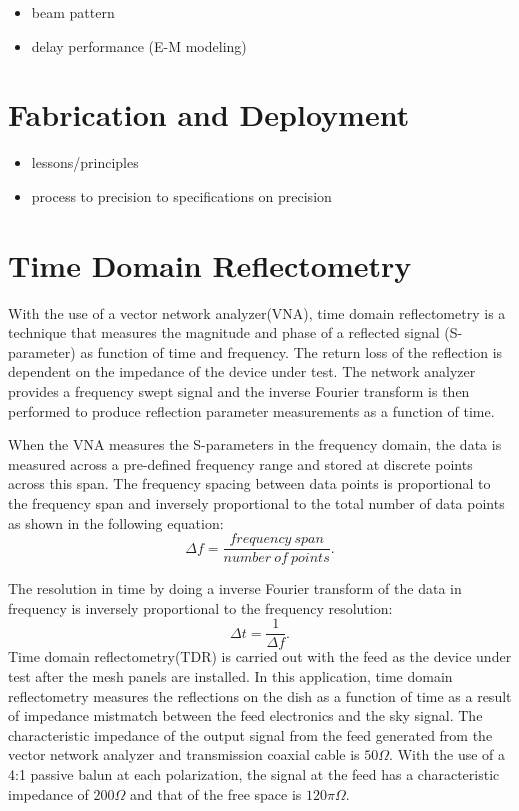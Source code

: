 \documentclass[preprint]{aastex}  %
\begin{document}
\begin{itemize}
\item beam pattern
\item delay performance (E-M modeling)
\end{itemize}

\section{Fabrication and Deployment}
\label{sec:deploy}

\begin{itemize}
\item lessons/principles
\item process to precision to specifications on precision
\end{itemize}
\clearpage

\section{Time Domain Reflectometry}
\label{sec:reflect}
With the use of a vector network analyzer(VNA), time domain reflectometry is a technique that measures the magnitude and phase of a reflected signal (S-parameter) as function of time and frequency. The return loss of the reflection is dependent on the impedance of the device under test. The network analyzer provides
 a frequency swept signal and the inverse Fourier transform is then performed to produce reflection parameter measurements as a function of time.

When the VNA measures the S-parameters in the frequency domain, the data is measured across a pre-defined frequency range and stored at discrete points across this span. The frequency spacing between data points is proportional to the frequency span and inversely proportional to the total number of data points as shown in the following equation:
\begin{equation}
\Delta f = \frac{frequency\ span}{number\ of\ points}.
\end{equation}

The resolution in time by doing a inverse Fourier transform of the data in frequency is inversely proportional to the frequency resolution:
\begin{equation}
\Delta t = \frac{1}{\Delta f}.
\label{Eqn:res}
\end{equation}
Time domain reflectometry(TDR) is carried out with the feed as the device under test after the mesh panels are installed. In this application, time domain reflectometry measures the reflections on the dish as a function of time as a result of impedance mistmatch between the feed electronics and the sky signal. The characteristic impedance of the output signal from the feed generated from the vector network analyzer and transmission coaxial cable is $50 \Omega$. With the use of a 4:1 passive balun at each polarization, the signal at the feed has a characteristic impedance of $200\Omega$ and that of the free space is $120\pi\Omega$. 
\end{document}

